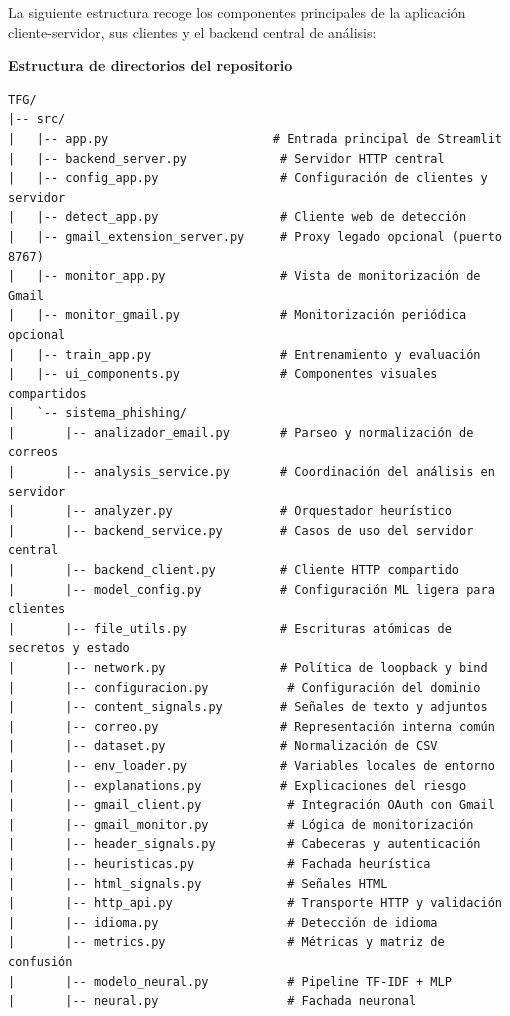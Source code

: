 \documentclass[11pt,a4paper,oneside]{report}
\begin{document}
La siguiente estructura recoge los componentes principales de la aplicación cliente-servidor, sus clientes y el backend central de análisis:

\textbf{Estructura de directorios del repositorio}

\begin{lstlisting}
TFG/
|-- src/
|   |-- app.py                       # Entrada principal de Streamlit
|   |-- backend_server.py             # Servidor HTTP central
|   |-- config_app.py                 # Configuración de clientes y servidor
|   |-- detect_app.py                 # Cliente web de detección
|   |-- gmail_extension_server.py     # Proxy legado opcional (puerto 8767)
|   |-- monitor_app.py                # Vista de monitorización de Gmail
|   |-- monitor_gmail.py              # Monitorización periódica opcional
|   |-- train_app.py                  # Entrenamiento y evaluación
|   |-- ui_components.py              # Componentes visuales compartidos
|   `-- sistema_phishing/
|       |-- analizador_email.py       # Parseo y normalización de correos
|       |-- analysis_service.py       # Coordinación del análisis en servidor
|       |-- analyzer.py               # Orquestador heurístico
|       |-- backend_service.py        # Casos de uso del servidor central
|       |-- backend_client.py         # Cliente HTTP compartido
|       |-- model_config.py           # Configuración ML ligera para clientes
|       |-- file_utils.py             # Escrituras atómicas de secretos y estado
|       |-- network.py                # Política de loopback y bind
|       |-- configuracion.py           # Configuración del dominio
|       |-- content_signals.py        # Señales de texto y adjuntos
|       |-- correo.py                 # Representación interna común
|       |-- dataset.py                # Normalización de CSV
|       |-- env_loader.py             # Variables locales de entorno
|       |-- explanations.py           # Explicaciones del riesgo
|       |-- gmail_client.py            # Integración OAuth con Gmail
|       |-- gmail_monitor.py           # Lógica de monitorización
|       |-- header_signals.py          # Cabeceras y autenticación
|       |-- heuristicas.py             # Fachada heurística
|       |-- html_signals.py            # Señales HTML
|       |-- http_api.py                # Transporte HTTP y validación
|       |-- idioma.py                  # Detección de idioma
|       |-- metrics.py                 # Métricas y matriz de confusión
|       |-- modelo_neural.py           # Pipeline TF-IDF + MLP
|       |-- neural.py                  # Fachada neuronal

\end{lstlisting}
\end{document}
